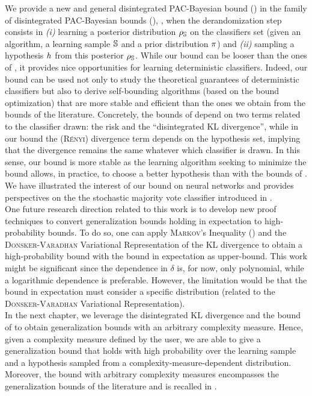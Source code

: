 We provide a new and general disintegrated PAC-Bayesian bound () in the family of disintegrated PAC-Bayesian bounds (), \ie, when the derandomization step consists in {\it (i)} learning a posterior distribution $\AQ$ on the classifiers set (given an algorithm, a learning sample $\S$ and a prior distribution $\P$) and {\it (ii)} sampling a hypothesis $\h$ from this posterior $\AQ$.
While our bound can be looser than the ones of \citet{RivasplataKuzborskijSzepesvariShaweTaylor2020,BlanchardFleuret2007,Catoni2007}, it provides nice opportunities for learning deterministic classifiers.
Indeed, our bound can be used not only to study the theoretical guarantees of deterministic classifiers but also to derive self-bounding algorithms (based on the bound optimization) that are more stable and efficient than the ones we obtain from the bounds of the literature.
Concretely, the bounds of \citet{RivasplataKuzborskijSzepesvariShaweTaylor2020,BlanchardFleuret2007,Catoni2007} depend on two terms related to the classifier drawn: the risk and the ``disintegrated KL divergence'', while in our bound the (\textsc{Rényi}) divergence term depends on the hypothesis set, implying that the divergence remains the same whatever which classifier is drawn.  
In this sense, our bound is more stable as the learning algorithm seeking to minimize the bound allows, in practice, to choose a better hypothesis than with the bounds of \citet{RivasplataKuzborskijSzepesvariShaweTaylor2020,BlanchardFleuret2007,Catoni2007}.
We have illustrated the interest of our bound on neural networks and provides perspectives on the the stochastic majority vote classifier introduced in .\\

One future research direction related to this work is to develop new proof techniques to convert generalization bounds holding in expectation \citep[see \eg,][]{XuRaginsky2017} to high-probability bounds.
To do so, one can apply \textsc{Markov}'s Inequality () and the \textsc{Donsker}-\textsc{Varadhan} Variational Representation of the KL divergence to obtain a high-probability bound with the bound in expectation as upper-bound.
This work might be significant since the dependence in $\delta$ is, for now, only polynomial, while a logarithmic dependence is preferable.
However, the limitation would be that the bound in expectation must consider a specific distribution (related to the \textsc{Donsker}-\textsc{Varadhan} Variational Representation).\\

In the next chapter, we leverage the disintegrated KL divergence and the bound of \citet{RivasplataKuzborskijSzepesvariShaweTaylor2020} to obtain generalization bounds with an arbitrary complexity measure.
Hence, given a complexity measure defined by the user, we are able to give a generalization bound that holds with high probability over the learning sample and a hypothesis sampled from a complexity-measure-dependent distribution.
Moreover, the bound with arbitrary complexity measures encompasses the generalization bounds of the literature and is recalled in .